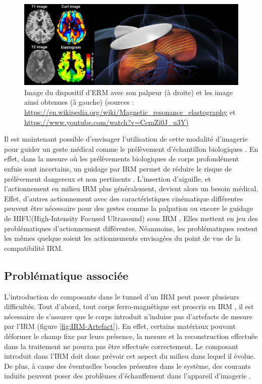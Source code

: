 \documentclass[10pt, a4paper]{article}
\begin{document}
    
\begin{figure}[ht!]
\centering
\includegraphics[scale=0.4]{ImageIntro/ERM.png}
\caption{Image du dispositif d'ERM avec son palpeur (à droite) et les image ainsi obtenues (à gauche) (sources : \url{https://en.wikipedia.org/wiki/Magnetic_resonance_elastography} et \url{https://www.youtube.com/watch?v=CcmZi0J_u3Y)}}
\label{fig:ERM}
\end{figure}

Il est maintenant possible d'envisager l'utilisation de cette modalité d'imagerie pour guider un geste médical comme le prélèvement d'échantillon biologiques \cite{Cleary2018}. En effet, dans la mesure où les prélèvements biologiques de corps profondément enfuis sont incertains, un guidage par IRM permet de réduire le risque de prélèvement dangereux et non pertinents \cite{Cleary2018}. L'insertion d'aiguille, et l'actionnement en milieu IRM plus généralement, devient alors un besoin médical.\\

Effet, d'autres actionnement avec des caractéristiques cinématique différentes peuvent être nécessaire pour des gestes comme la palpation \cite{Moerman2013} ou encore le guidage de HIFU(High-Intensity Focused Ultrasound) sous IRM \cite{Melzer2008}\cite{Wang2019}. Elles mettent en jeu des problématiques d'actionnement différentes. Néanmoins, les problématiques restent les mêmes quelque soient les actionnements envisagées du point de vue de la compatibilité IRM.
    
    \subsection{Problématique associée}
    
 L'introduction de composants dans le tunnel d'un IRM peut poser plusieurs difficultés. Tout d'abord, tout corps ferro-magnétique est proscris en IRM \cite{Sammet2016}, il est nécessaire de s'assurer que le corps introduit n'induise pas d'artefacts de mesure par l'IRM \cite{Sammet2016} (figure \ref{fig:IRM-Artefact}). En effet, certains matériaux pouvant déformer le champ fixe par leurs présence, la mesure et la reconstruction effectuée dans la traitement ne pourra pas être effectuée correctement. Le composant introduit dans l'IRM doit donc prévoir cet aspect du milieu dans lequel il évolue. De plus, à cause des éventuelles boucles présentes dans le système, des courants induits peuvent poser des problèmes d'échauffement dans l'appareil d'imagerie \cite{Sammet2016}.
\end{document}
